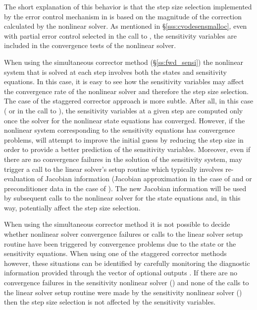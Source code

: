 The short explanation of this behavior is that the step size selection
implemented by the error control mechanism in {\cvodes} is based on the 
magnitude of the correction calculated by the nonlinear solver. As mentioned
in \S\ref{sss:cvodesensmalloc}, even with partial error control selected
in the call to , the sensitivity variables are included
in the convergence tests of the nonlinear solver.

When using the simultaneous corrector method (\S\ref{ss:fwd_sensi}) 
the nonlinear system that is solved at each step involves both the states
and sensitivity equations. In this case, it is easy to see how the sensitivity 
variables may affect the convergence rate of the nonlinear solver and therefore
the step size selection. 
The case of the staggered corrector approach is more subtle. 
After all, in this case ( or  in the call 
to ), the sensitivity variables at a given step are 
computed only once the solver for the nonlinear state equations has converged.
However, if the nonlinear system corresponding to the sensitivity equations
has convergence problems, {\cvodes} will attempt to improve the initial guess
by reducing the step size in order to provide a better prediction of the
sensitivity variables. Moreover, even if there are no convergence failures in
the solution of the sensitivity system, {\cvodes} may trigger a call to the
linear solver's setup routine which typically involves re-evaluation of Jacobian
information (Jacobian approximation in the case of {\cvdense} and {\cvband} or
preconditioner data in the case of {\cvspgmr}). The new Jacobian information
will be used by subsequent calls to the nonlinear solver for the state equations
and, in this way, potentially affect the step size selection.

When using the simultaneous corrector method it is not possible to decide whether 
nonlinear solver convergence failures or calls to the linear solver setup routine
have been triggered by convergence problems due to the state or the sensitivity 
equations.
When using one of the staggered corrector methods however, these situations can be 
identified by carefully monitoring the diagnostic information provided through 
the vector of optional outputs . If there are no convergence
failures in the sensitivity nonlinear solver () and none
of the calls to the linear solver setup routine were made by the sensitivity
nonlinear solver () then the step size selection is
not affected by the sensitivity variables.


